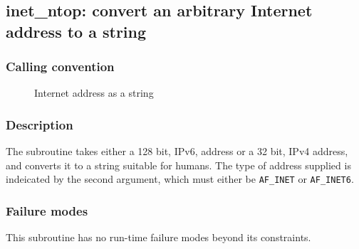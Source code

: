 \clearpage
{}
{}
\label{subr:inet-ntop}
\subsection*{inet\_ntop: convert an arbitrary Internet address to a string}

\subsubsection*{Calling convention}

\begin{description}
\item[] Internet address as a string
\end{description}

\subsubsection*{Description}

The  subroutine takes either a 128 bit, IPv6,
address or a 32 bit, IPv4 address, and converts it to a string
suitable for humans.  The type of address supplied is indeicated by
the second argument, which must either be \verb|AF_INET| or
\verb|AF_INET6|.

\subsubsection*{Failure modes}

This subroutine has no run-time failure modes beyond its constraints.
